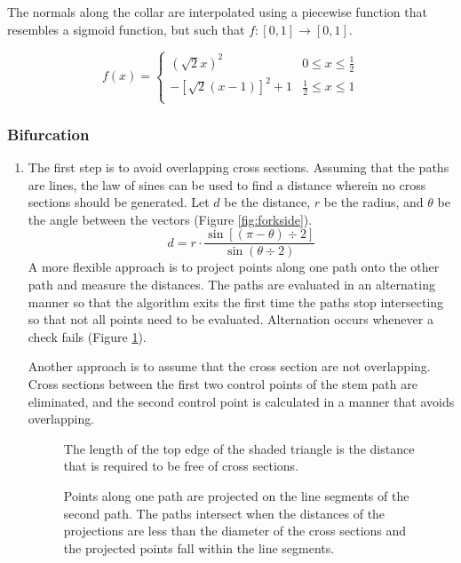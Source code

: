 \documentclass[10pt]{article}
\begin{document}
The normals along the collar are interpolated using a piecewise function that resembles a sigmoid function, but such that $ f: \left[ 0, 1 \right] \rightarrow \left[ 0, 1 \right] $.

\[ f(x) =
\begin{cases}
(\sqrt{2}x)^2 & 0 \leq x \leq \frac{1}{2}\\
-\left[\sqrt{2}(x-1)\right]^2 + 1 & \frac{1}{2} \leq x \leq 1 \\
\end{cases} \]

\subsubsection{Bifurcation}
\begin{enumerate}
\item The first step is to avoid overlapping cross sections. Assuming that the paths are lines, the law of sines can be used to find a distance wherein no cross sections should be generated. Let $ d $ be the distance, $ r $ be the radius, and $ \theta $ be the angle between the vectors (Figure \ref{fig:forkside}).
\[ d = r \cdot \frac{\sin[(\pi-\theta)\div2]}{\sin (\theta\div2)} \]
A more flexible approach is to project points along one path onto the other path and measure the distances. The paths are evaluated in an alternating manner so that the algorithm exits the first time the paths stop intersecting so that not all points need to be evaluated. Alternation occurs whenever a check fails (Figure \ref{fig:path}).

Another approach is to assume that the cross section are not overlapping. Cross sections between the first two control points of the stem path are eliminated, and the second control point is calculated in a manner that avoids overlapping.

\begin{figure}[H]
 \begin{minipage}[H]{0.46\textwidth}
  \centering
  
  \caption{The length of the top edge of the shaded triangle is the distance that is required to be free of cross sections.} \label{fig:forkside}
 \end{minipage}
 \hfill
 \begin{minipage}[H]{0.46\textwidth}
  \centering
  
  \caption{Points along one path are projected on the line segments of the second path. The paths intersect when the distances of the projections are less than the diameter of the cross sections and the projected points fall within the line segments.} \label{fig:path}
 \end{minipage}
\end{figure}


\end{enumerate}
\end{document}
